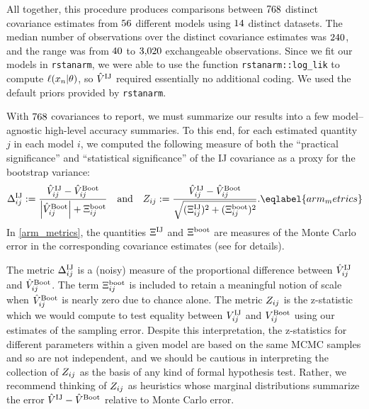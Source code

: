 All together, this procedure produces comparisons between $768$
distinct covariance estimates from $56$ different models using
$14$ distinct datasets. The median number of observations over the
distinct covariance estimates was $240$, and the range was from
$40$ to $3{,}020$ exchangeable observations.  Since we fit our
models in \texttt{rstanarm}, we were able to use the function
\texttt{rstanarm::log\_lik} to compute $\ell(x_n \vert \theta)$, so
$\hat{V}^{\mathrm{IJ}}$ required essentially no additional coding.  We used the default
priors provided by \texttt{rstanarm}.




\ARMGraphDiff{}


\ARMGraphZ{}


With $768$ covariances to report, we must summarize our results
into a few model--agnostic high-level accuracy summaries.  To this end, for each
estimated quantity $j$ in each model $i$, we computed the following measure of both the
``practical significance'' and ``statistical significance'' of the IJ covariance
as a proxy for the bootstrap variance:
%
\begin{align}
%
\normdiffij_{ij} :=
     \frac{\gcovijhat_{ij} - \gcovboothat_{ij}}
     {\left| \gcovboothat_{ij} \right| + \seboot_{ij}}
\quad\textrm{and}\quad
\zdiff_{ij} :=
\frac{\gcovijhat_{ij} - \gcovboothat_{ij}}
     {\sqrt{(\seij_{ij})^2 + (\seboot_{ij})^2}}.
\eqlabel{arm_metrics}
%
\end{align}
%
In \eqref{arm_metrics}, the quantities $\Xi^{\textrm{IJ}}$ and $\Xi^{\textrm{boot}}$ are measures of
the Monte Carlo error in the corresponding covariance estimates
(see  for details).

The metric $\Delta^{\mathrm{IJ}}_{ij}$ is a (noisy) measure of the proportional
difference between $\hat{V}^{\mathrm{IJ}}_{ij}$ and $\hat{V}^{\mathrm{Boot}}_{ij}$. The term
$\Xi^{\textrm{boot}}_{ij}$ is included to retain a meaningful notion of scale when
$\hat{V}^{\mathrm{Boot}}_{ij}$ is nearly zero due to chance alone.
%
The metric $Z_{ij}$ is the z-statistic which we would compute to test
equality between $V^{\mathrm{IJ}}_{ij}$ and $V^{\mathrm{Boot}}_{ij}$ using our estimates of
the sampling error.  Despite this interpretation, the z-statistics for different
parameters within a given model are based on the same MCMC samples and so are
not independent, and we should be cautious in interpreting the collection of
$Z_{ij}$ as the basis of any kind of formal hypothesis test. Rather, we
recommend thinking of $Z_{ij}$ as heuristics whose marginal distributions
summarize the error $\hat{V}^{\mathrm{IJ}} - \hat{V}^{\mathrm{Boot}}$ relative to Monte Carlo error.


